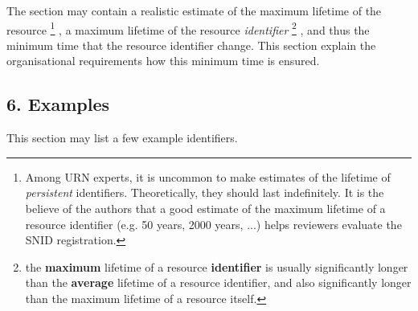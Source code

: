\documentclass[12pt]{article}  %
\begin{document}
The section may contain a realistic estimate of the maximum lifetime of the resource%
\footnote{Among URN experts, it is uncommon to make estimates of the 
lifetime of \emph{persistent} identifiers. Theoretically, they should last 
indefinitely. It is the believe of the authors that a good estimate of the 
maximum lifetime of a resource identifier (e.g. 50 years, 2000 years, ...) 
helps reviewers evaluate the SNID registration.}%
, a maximum lifetime of the resource \emph{identifier}%
\footnote{the \textbf{maximum} lifetime of a resource \textbf{identifier} is 
usually significantly longer than the \textbf{average} lifetime of a resource 
identifier, and also significantly longer than the maximum lifetime of a 
resource itself.}%
, and thus the minimum time that the resource identifier \MUSTNOT{} change.
This section \SHOULD{} explain the organisational requirements how
this minimum time is ensured.

\subsection*{6. Examples}

This section may list a few example identifiers.
\end{document}
